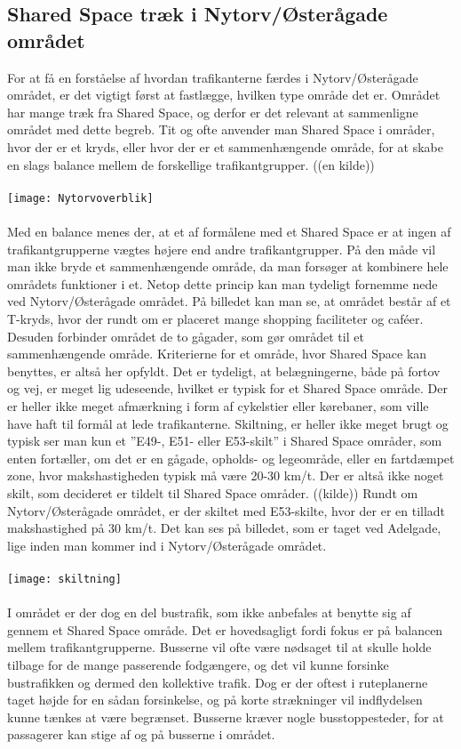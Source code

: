 
\subsection{Shared Space træk i Nytorv/Østerågade området}
\label{omrade_sharedspace}
For at få en forståelse af hvordan trafikanterne færdes i Nytorv/Østerågade området, er det vigtigt først at fastlægge, hvilken type område det er. Området har mange træk fra Shared Space, og derfor er det relevant at sammenligne området med dette begreb. 
Tit og ofte anvender man Shared Space i områder, hvor der er et kryds, eller hvor der er et sammenhængende område, for at skabe en slags balance mellem de forskellige trafikantgrupper. ((en kilde))
\\\\
\texttt{[image: Nytorvoverblik]}
\\\\
Med en balance menes der, at et af formålene med et Shared Space er at ingen af trafikantgrupperne vægtes højere end andre trafikantgrupper. På den måde vil man ikke bryde et sammenhængende område, da man forsøger at kombinere hele områdets funktioner i et. Netop dette princip kan man tydeligt fornemme nede ved Nytorv/Østerågade området. På billedet kan man se, at området består af et T-kryds, hvor der rundt om er placeret mange shopping faciliteter og caféer. Desuden forbinder området de to gågader, som gør området til et sammenhængende område. Kriterierne for et område, hvor Shared Space kan benyttes, er altså her opfyldt. 
Det er tydeligt, at belægningerne, både på fortov og vej, er meget lig udeseende, hvilket er typisk for et Shared Space område. Der er heller ikke meget afmærkning i form af cykelstier eller kørebaner, som ville have haft til formål at lede trafikanterne. Skiltning, er heller ikke meget brugt og typisk ser man kun et ”E49-, E51- eller E53-skilt” i Shared Space områder, som enten fortæller, om det er en gågade, opholds- og legeområde, eller en fartdæmpet zone, hvor makshastigheden typisk må være 20-30 km/t. Der er altså ikke noget skilt, som decideret er tildelt til Shared Space områder. ((kilde)) Rundt om Nytorv/Østerågade området, er der skiltet med E53-skilte, hvor der er en tilladt makshastighed på 30 km/t. Det kan ses på billedet, som er taget ved Adelgade, lige inden man kommer ind i Nytorv/Østerågade området.
\\\\
\texttt{[image: skiltning]}
\\\\
I området er der dog en del bustrafik, som ikke anbefales at benytte sig af gennem et Shared Space område. Det er hovedsagligt fordi fokus er på balancen mellem trafikantgrupperne. Busserne vil ofte være nødsaget til at skulle holde tilbage for de mange passerende fodgængere, og det vil kunne forsinke bustrafikken og dermed den kollektive trafik. Dog er der oftest i ruteplanerne taget højde for en sådan forsinkelse, og på korte strækninger vil indflydelsen kunne tænkes at være begrænset. Busserne kræver nogle busstoppesteder, for at passagerer kan stige af og på busserne i området. 
